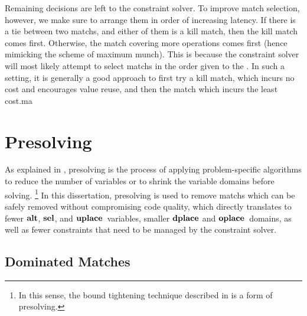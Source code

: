 Remaining decisions are left to the \gls{constraint solver}.
%
To improve \gls{match} selection, however, we make sure to arrange them in
order of increasing latency.
%
If there is a tie between two \glspl{match}, and either of them is a \gls{kill
  match}, then the \gls{kill match} comes first.
%
Otherwise, the \gls{match} covering more \glspl{operation} comes first (hence
mimicking the scheme of \gls{maximum munch}).
%
This is because the \gls{constraint solver} will most likely attempt to select
\glspl{match} in the order given to the .
%
In such a setting, it is generally a good approach to first try a \gls{kill
  match}, which incurs no cost and encourages value reuse, and then the
\gls{match} which incurs the least cost.ma


\section{Presolving}

As explained in , \gls{presolving} is the
process of applying problem-specific algorithms to reduce the number of
\glspl{variable} or to shrink the \gls{variable} \glspl{domain} before
solving.\!%
%
\footnote{%
  In this sense, the bound tightening technique described in
   is a form of \gls{presolving}.%
}
%
In this dissertation, \gls{presolving} is used to remove \glspl{match} which can
be safely removed without compromising code quality, which directly translates
to fewer $\mVar{alt}$, $\mVar{sel}$, and $\mVar{uplace}$~\glspl{variable},
smaller $\mVar{dplace}$ and $\mVar{oplace}$~\glspl{domain}, as well as fewer
\glspl{constraint} that need to be managed by the \gls{constraint solver}.


\subsection{Dominated Matches}

